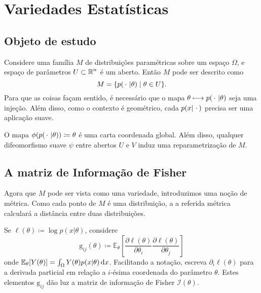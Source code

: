 \section{Variedades Estatísticas}
\subsection{Objeto de estudo}
Considere uma família $M$ de distribuições paramétricas sobre um espaço $\Omega$, e espaço de parâmetros $U \subset \operatorname{\mathbb{R}}^n$ é um aberto. Então $M$ pode ser descrito como
\begin{equation*}
	M = \{p(\operatorname{\,\cdot\,}|\theta) \mid \theta \in U\}.
\end{equation*}
Para que as coisas façam sentido, é necessário que o mapa $\theta \longmapsto p(\operatorname{\,\cdot\,}|\theta)$ seja uma injeção. Além disso, como o contexto é geométrico, cada $p(x|\operatorname{\,\cdot\,})$ precisa ser uma aplicação suave.

O mapa $\phi(p(\operatorname{\,\cdot\,}|\theta)) \coloneqq \theta$ é uma carta coordenada global. Além disso, qualquer difeomorfismo suave $\psi$ entre abertos $U$ e $V$ induz uma reparametrização de $M$.

\subsection{A matriz de Informação de Fisher}
Agora que $M$ pode ser vista como uma variedade, introduzimos uma noção de métrica. Como cada ponto de $M$ é uma distribuição, a a referida métrica calculará a distância entre duas distribuições.

Se $\ell(\theta) \coloneqq \log p(x|\theta)$, considere
$$\mathrm{g}_{ij}(\theta) \coloneqq \mathbb E_\theta\left[\dfrac{\partial \ell(\theta)}{\partial \theta_i} \dfrac{\partial \ell(\theta)}{\partial \theta_j}\right]$$
onde $\mathbb E_\theta[Y(\theta)] = \int_\Omega Y(\theta) p(x|\theta)\,{\operatorname{d}}{x}$. Facilitando a notação, escreva $\partial_i \ell(\theta)$ para a derivada particial em relação a $i$-ésima coordenada do parâmetro $\theta$. Estes elementos $\mathrm{g}_{ij}$ dão luz a matriz de informação de Fisher $\mathcal I(\theta)$.

